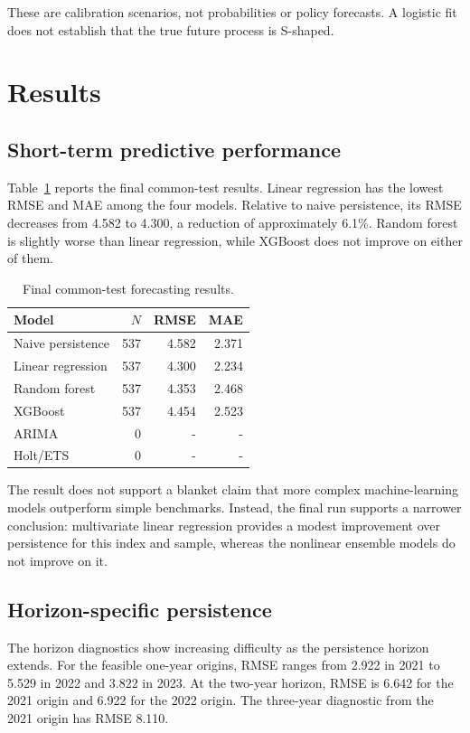 \documentclass[conference]{IEEEtran}
\begin{document}
These are calibration scenarios, not probabilities or policy forecasts. A logistic fit does not establish that the true future process is S-shaped.

\section{Results}

\subsection{Short-term predictive performance}

Table~\ref{tab:model_results} reports the final common-test results. Linear regression has the lowest RMSE and MAE among the four models. Relative to naive persistence, its RMSE decreases from 4.582 to 4.300, a reduction of approximately 6.1\%. Random forest is slightly worse than linear regression, while XGBoost does not improve on either of them.

\begin{table}[t]
\centering
\caption{Final common-test forecasting results.}
\label{tab:model_results}
\begin{tabular}{lrrr}
\toprule
Model & $N$ & RMSE & MAE\\
\midrule
Naive persistence & 537 & 4.582 & 2.371\\
Linear regression & 537 & 4.300 & 2.234\\
Random forest & 537 & 4.353 & 2.468\\
XGBoost & 537 & 4.454 & 2.523\\
ARIMA & 0 & - & -\\
Holt/ETS & 0 & - & -\\
\bottomrule
\end{tabular}
\end{table}

The result does not support a blanket claim that more complex machine-learning models outperform simple benchmarks. Instead, the final run supports a narrower conclusion: multivariate linear regression provides a modest improvement over persistence for this index and sample, whereas the nonlinear ensemble models do not improve on it.

\subsection{Horizon-specific persistence}

The horizon diagnostics show increasing difficulty as the persistence horizon extends. For the feasible one-year origins, RMSE ranges from 2.922 in 2021 to 5.529 in 2022 and 3.822 in 2023. At the two-year horizon, RMSE is 6.642 for the 2021 origin and 6.922 for the 2022 origin. The three-year diagnostic from the 2021 origin has RMSE 8.110.
\end{document}
